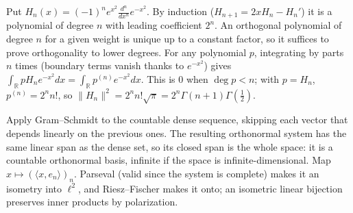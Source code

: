 \documentclass[11pt,a4paper]{article}
\begin{document}
Put \(H_n(x)=(-1)^ne^{x^2}\frac{d^n}{dx^n}e^{-x^2}\). By induction (\(H_{n+1}=2xH_n-H_n'\)) it is a polynomial of degree \(n\) with leading coefficient \(2^n\). An orthogonal polynomial of degree \(n\) for a given weight is unique up to a constant factor, so it suffices to prove orthogonality to lower degrees.
For any polynomial \(p\), integrating by parts \(n\) times (boundary terms vanish thanks to \(e^{-x^2}\)) gives \(\int_{\mathbb R}pH_ne^{-x^2}dx=\int_{\mathbb R}p^{(n)}e^{-x^2}dx\). This is \(0\) when \(\deg p\lt n\); with \(p=H_n\), \(p^{(n)}=2^nn!\), so \(\lVert H_n\rVert^2=2^nn!\sqrt\pi=2^n\Gamma(n+1)\Gamma(\tfrac12)\).

Apply Gram--Schmidt to the countable dense sequence, skipping each vector that depends linearly on the previous ones. The resulting orthonormal system has the same linear span as the dense set, so its closed span is the whole space: it is a countable orthonormal basis, infinite if the space is infinite-dimensional.
Map \(x\mapsto(\langle x,e_n\rangle)_n\). Parseval (valid since the system is complete) makes it an isometry into \(\ell^2\), and Riesz--Fischer makes it onto; an isometric linear bijection preserves inner products by polarization.
\end{document}
